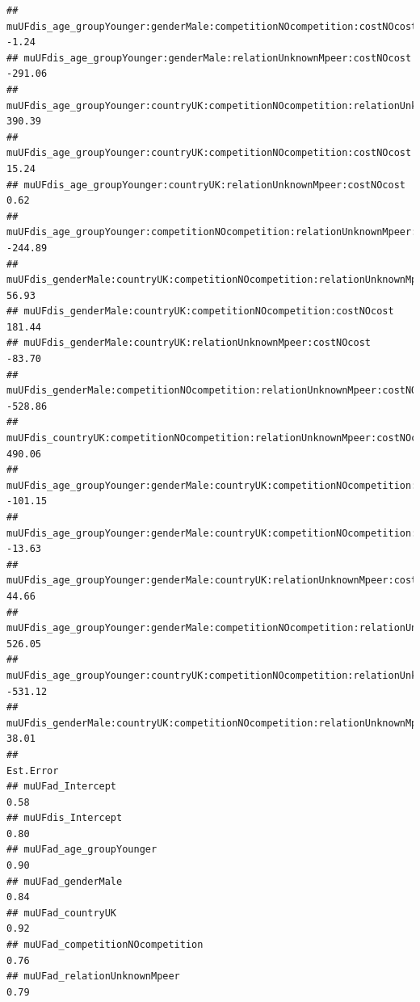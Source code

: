 \documentclass[
]{article}
\begin{document}
\begin{verbatim}
## muUFdis_age_groupYounger:genderMale:competitionNOcompetition:costNOcost                         -1.24
## muUFdis_age_groupYounger:genderMale:relationUnknownMpeer:costNOcost                           -291.06
## muUFdis_age_groupYounger:countryUK:competitionNOcompetition:relationUnknownMpeer               390.39
## muUFdis_age_groupYounger:countryUK:competitionNOcompetition:costNOcost                          15.24
## muUFdis_age_groupYounger:countryUK:relationUnknownMpeer:costNOcost                               0.62
## muUFdis_age_groupYounger:competitionNOcompetition:relationUnknownMpeer:costNOcost             -244.89
## muUFdis_genderMale:countryUK:competitionNOcompetition:relationUnknownMpeer                      56.93
## muUFdis_genderMale:countryUK:competitionNOcompetition:costNOcost                               181.44
## muUFdis_genderMale:countryUK:relationUnknownMpeer:costNOcost                                   -83.70
## muUFdis_genderMale:competitionNOcompetition:relationUnknownMpeer:costNOcost                   -528.86
## muUFdis_countryUK:competitionNOcompetition:relationUnknownMpeer:costNOcost                     490.06
## muUFdis_age_groupYounger:genderMale:countryUK:competitionNOcompetition:relationUnknownMpeer   -101.15
## muUFdis_age_groupYounger:genderMale:countryUK:competitionNOcompetition:costNOcost              -13.63
## muUFdis_age_groupYounger:genderMale:countryUK:relationUnknownMpeer:costNOcost                   44.66
## muUFdis_age_groupYounger:genderMale:competitionNOcompetition:relationUnknownMpeer:costNOcost   526.05
## muUFdis_age_groupYounger:countryUK:competitionNOcompetition:relationUnknownMpeer:costNOcost   -531.12
## muUFdis_genderMale:countryUK:competitionNOcompetition:relationUnknownMpeer:costNOcost           38.01
##                                                                                              Est.Error
## muUFad_Intercept                                                                                  0.58
## muUFdis_Intercept                                                                                 0.80
## muUFad_age_groupYounger                                                                           0.90
## muUFad_genderMale                                                                                 0.84
## muUFad_countryUK                                                                                  0.92
## muUFad_competitionNOcompetition                                                                   0.76
## muUFad_relationUnknownMpeer                                                                       0.79

\end{verbatim}
\end{document}
